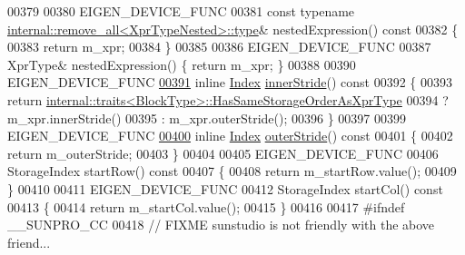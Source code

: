 \begin{DoxyCode}
00379 
00380     EIGEN\_DEVICE\_FUNC
00381     \textcolor{keyword}{const} \textcolor{keyword}{typename} \hyperlink{group___sparse_core___module}{internal::remove\_all<XprTypeNested>::type}& 
      nestedExpression()\textcolor{keyword}{ const}
00382 \textcolor{keyword}{    }\{ 
00383       \textcolor{keywordflow}{return} m\_xpr; 
00384     \}
00385 
00386     EIGEN\_DEVICE\_FUNC
00387     XprType& nestedExpression() \{ \textcolor{keywordflow}{return} m\_xpr; \}
00388       
00390     EIGEN\_DEVICE\_FUNC
\hyperlink{class_eigen_1_1internal_1_1_block_impl__dense_3_01_xpr_type_00_01_block_rows_00_01_block_cols_00_01_inner_panel_00_01true_01_4_a91fea2e027a3b057b5f70ab52a1a24b7}{00391}     \textcolor{keyword}{inline} \hyperlink{namespace_eigen_a62e77e0933482dafde8fe197d9a2cfde}{Index} \hyperlink{class_eigen_1_1internal_1_1_block_impl__dense_3_01_xpr_type_00_01_block_rows_00_01_block_cols_00_01_inner_panel_00_01true_01_4_a91fea2e027a3b057b5f70ab52a1a24b7}{innerStride}()\textcolor{keyword}{ const}
00392 \textcolor{keyword}{    }\{
00393       \textcolor{keywordflow}{return} \hyperlink{struct_eigen_1_1internal_1_1traits}{internal::traits<BlockType>::HasSameStorageOrderAsXprType}
00394              ? m\_xpr.innerStride()
00395              : m\_xpr.outerStride();
00396     \}
00397 
00399     EIGEN\_DEVICE\_FUNC
\hyperlink{class_eigen_1_1internal_1_1_block_impl__dense_3_01_xpr_type_00_01_block_rows_00_01_block_cols_00_01_inner_panel_00_01true_01_4_ac6f37b9a06897f0891fcd7b65ce2800e}{00400}     \textcolor{keyword}{inline} \hyperlink{namespace_eigen_a62e77e0933482dafde8fe197d9a2cfde}{Index} \hyperlink{class_eigen_1_1internal_1_1_block_impl__dense_3_01_xpr_type_00_01_block_rows_00_01_block_cols_00_01_inner_panel_00_01true_01_4_ac6f37b9a06897f0891fcd7b65ce2800e}{outerStride}()\textcolor{keyword}{ const}
00401 \textcolor{keyword}{    }\{
00402       \textcolor{keywordflow}{return} m\_outerStride;
00403     \}
00404 
00405     EIGEN\_DEVICE\_FUNC
00406     StorageIndex startRow()\textcolor{keyword}{ const}
00407 \textcolor{keyword}{    }\{
00408       \textcolor{keywordflow}{return} m\_startRow.value();
00409     \}
00410 
00411     EIGEN\_DEVICE\_FUNC
00412     StorageIndex startCol()\textcolor{keyword}{ const}
00413 \textcolor{keyword}{    }\{
00414       \textcolor{keywordflow}{return} m\_startCol.value();
00415     \}
00416 
00417 \textcolor{preprocessor}{  #ifndef \_\_SUNPRO\_CC}
00418   \textcolor{comment}{// FIXME sunstudio is not friendly with the above friend...}

\end{DoxyCode}
